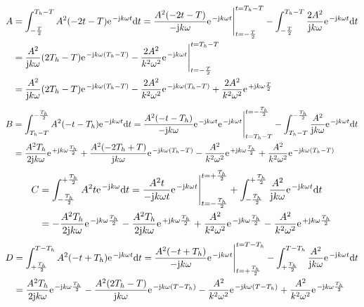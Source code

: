 \documentclass[11pt,a4paper,DIV=12]{scrartcl}
\newcommand{\diff}{\mathrm{d}}
\begin{document}
%
%
%
\begin{align}
	A&=\int_{-\frac{T}{2}}^{T_h-T}A^2(-2t-T)\e^{-\im k \omega t}\diff t=\frac{A^2(-2t-T)}{-\im k \omega }\e^{-\im k \omega t}\Bigg |_{t=-\frac{T}{2}}^{t=T_h-T}-\int_{-\frac{T}{2}}^{T_h-T}\frac{2A^2}{\im k \omega}\e^{-\im k \omega t}\diff t\nonumber \\
	&=\frac{A^2}{\im k \omega}(2T_h-T)\e^{-\im k \omega (T_h-T)}-\frac{2A^2}{k^2\omega^2}\e^{-\im k \omega t}\Bigg |_{t=-\frac{T
		}{2}}^{t=T_h-T}\nonumber \\
	&=\frac{A^2}{\im k \omega}(2T_h-T)\e^{-\im k \omega (T_h-T)}-\frac{2A^2}{k^2\omega^2}\e^{-\im k \omega (T_h-T)}+\frac{2A^2}{k^2\omega^2}\e^{+\im k \omega \frac{T}{2}}
\end{align}
%
%
%
\begin{align}
	B&=\int_{T_h-T}^{-\frac{T_h}{2}}A^2(-t-T_h)\e^{-\im k \omega t}\diff t=\frac{A^2(-t-T_h)}{-\im k \omega}\e^{-\im k \omega t}\e^{-\im k \omega t}\Bigg |_{t=T_h-T}^{t=-\frac{T_h}{2}}-\int_{T_h-T}^{-\frac{T_h}{2}}\frac{A^2}{\im k \omega}\e^{-\im k \omega t}\diff t\nonumber \\
	&=\frac{A^2T_h}{2\im k \omega}\e^{+\im k \omega \frac{T_h}{2}}+\frac{A^2(-2T_h+T)}{\im k \omega}\e^{-\im k \omega (T_h-T)}-\frac{A^2}{k^2\omega^2}\e^{+\im k \omega \frac{T_h}{2}}+\frac{A^2}{k^2\omega^2}\e^{-\im k \omega (T_h-T)}
\end{align}
%
%
%
\begin{align}
	C&=\int_{-\frac{T_h}{2}}^{+\frac{T_h}{2}}A^2t\e^{-\im k \omega }\diff t=\frac{A^2t}{-\im k \omega t}\e^{-\im k \omega t}\Bigg |_{t=-\frac{T_h}{2}}^{t=+\frac{T_h}{2}}+\int_{-\frac{T_h}{2}}^{+\frac{T_h}{2}}\frac{A^2}{\im k \omega}\e^{-\im k \omega t}\diff t\nonumber \\
	&=-\frac{A^2T_h}{2\im k \omega}\e^{-\im k \omega \frac{T_h}{2}}-\frac{A^2T_h}{2\im k \omega}\e^{+\im k \omega \frac{T_h}{2}}+\frac{A^2}{k^2\omega^2}\e^{-\im k \omega \frac{T_h}{2}}-\frac{A^2}{k^2\omega^2}\e^{+\im k \omega \frac{T_h}{2}}
\end{align}
%
%
%
\begin{align}
	D&=\int_{+\frac{T_h}{2}}^{T-T_h}A^2(-t+T_h)\e^{-\im k \omega t}\diff t=\frac{A^2(-t+T_h)}{-\im k \omega}\e^{-\im k \omega t}\Bigg |_{t=+\frac{T_h}{2}}^{t=T-T_h}-\int_{+\frac{T_h}{2}}^{T-T_h}\frac{A^2}{\im k \omega}\e^{-\im k \omega t}\diff t\nonumber \\
	&=\frac{A^2T_h}{2\im k \omega}\e^{-\im k \omega \frac{T_h}{2}}-\frac{A^2(2T_h-T)}{\im k \omega}\e^{-\im k \omega (T-T_h)}-\frac{A^2}{k^2\omega^2}\e^{-\im k \omega (T-T_h)}+\frac{A^2}{ k^2 \omega^2}\e^{-\im k \omega \frac{T_h}{2}}
\end{align}
\end{document}
